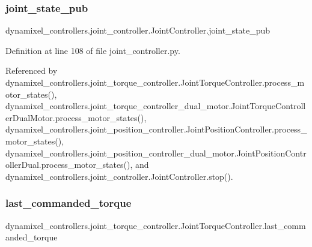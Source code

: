 \subsubsection{\texorpdfstring{joint\+\_\+state\+\_\+pub}{joint\_state\_pub}}
{\footnotesize\ttfamily dynamixel\+\_\+controllers.\+joint\+\_\+controller.\+Joint\+Controller.\+joint\+\_\+state\+\_\+pub\hspace{0.3cm}{\ttfamily [inherited]}}



Definition at line 108 of file joint\+\_\+controller.\+py.



Referenced by dynamixel\+\_\+controllers.\+joint\+\_\+torque\+\_\+controller.\+Joint\+Torque\+Controller.\+process\+\_\+motor\+\_\+states(), dynamixel\+\_\+controllers.\+joint\+\_\+torque\+\_\+controller\+\_\+dual\+\_\+motor.\+Joint\+Torque\+Controller\+Dual\+Motor.\+process\+\_\+motor\+\_\+states(), dynamixel\+\_\+controllers.\+joint\+\_\+position\+\_\+controller.\+Joint\+Position\+Controller.\+process\+\_\+motor\+\_\+states(), dynamixel\+\_\+controllers.\+joint\+\_\+position\+\_\+controller\+\_\+dual\+\_\+motor.\+Joint\+Position\+Controller\+Dual.\+process\+\_\+motor\+\_\+states(), and dynamixel\+\_\+controllers.\+joint\+\_\+controller.\+Joint\+Controller.\+stop().

\mbox{\label{classdynamixel__controllers_1_1joint__torque__controller_1_1_joint_torque_controller_abe5e0bb1146f3b4a6ba91f1ae865d5b2}} 
\subsubsection{\texorpdfstring{last\+\_\+commanded\+\_\+torque}{last\_commanded\_torque}}
{\footnotesize\ttfamily dynamixel\+\_\+controllers.\+joint\+\_\+torque\+\_\+controller.\+Joint\+Torque\+Controller.\+last\+\_\+commanded\+\_\+torque}



